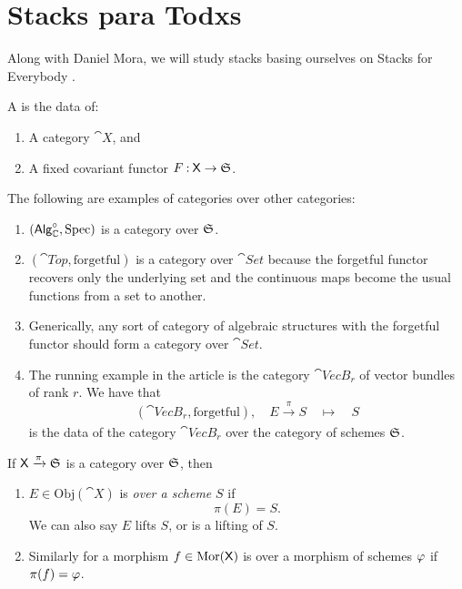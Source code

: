 \documentclass[12pt]{memoir}
\begin{document}
\section{Stacks para Todxs}

Along with Daniel Mora, we will study stacks basing ourselves on Stacks for Everybody . 

\begin{Def}
    A  is the data of:
    \begin{enumerate}
        \item A category \(\cat{X}\), and
        \item A fixed covariant functor \(F\mathbin{:}\mathsf{X}\to\mathfrak{S}\).
    \end{enumerate}
\end{Def}

\begin{Ex}
    The following are examples of categories over other categories:
    \begin{enumerate}
        \item \(\left(\mathsf{Alg}_{\mathbb{C}}^{\circ},\operatorname{Spec}\right)\) is a category over \(\mathfrak{S}\).
        \item \(\left(\cat{Top},\text{forgetful}\right)\) is a category over \(\cat{Set}\) because the forgetful functor recovers only the underlying set and the continuous maps become the usual functions from a set to another. 
        \item Generically, any sort of category of algebraic structures with the forgetful functor should form a category over \(\cat{Set}\).
        \item The running example in the article is the category \(\cat{VecB}_r\) of vector bundles of rank \(r\). We have that 
        \[
        \left(\cat{VecB}_r,\text{forgetful}\right),\quad E\xrightarrow[]{\pi}S\quad\mapsto\quad S
        \]
        is the data of the category \(\cat{VecB}_r\) over the category of schemes \(\mathfrak{S}\).
    \end{enumerate}
\end{Ex}

\begin{Def}
    If \(\mathsf{X}\xrightarrow[]{\pi}\mathfrak{S}\) is a category over \(\mathfrak{S}\), then 
    \begin{enumerate}
        \item \(E\in\text{Obj}(\cat{X})\) is \emph{over a scheme} \(S\) if 
        \[
        \pi(E)=S.
        \]
        We can also say \(E\) lifts \(S\), or is a lifting of \(S\).
        \item Similarly for a morphism \(f\in\operatorname{Mor}(\mathsf{X})\) is over a morphism of schemes \(\varphi\) if \(\pi(f)=\varphi\).
    \end{enumerate} 
\end{Def}
\end{document}
